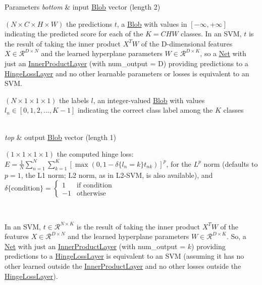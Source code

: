 \begin{DoxyParams}{Parameters}
{\em bottom} & input \mbox{\hyperlink{classcaffe_1_1_blob}{Blob}} vector (length 2)
\begin{DoxyEnumerate}
\item $ (N \times C \times H \times W) $ the predictions $ t $, a \mbox{\hyperlink{classcaffe_1_1_blob}{Blob}} with values in $ [-\infty, +\infty] $ indicating the predicted score for each of the $ K = CHW $ classes. In an S\+VM, $ t $ is the result of taking the inner product $ X^T W $ of the D-\/dimensional features $ X \in \mathcal{R}^{D \times N} $ and the learned hyperplane parameters $ W \in \mathcal{R}^{D \times K} $, so a \mbox{\hyperlink{classcaffe_1_1_net}{Net}} with just an \mbox{\hyperlink{classcaffe_1_1_inner_product_layer}{Inner\+Product\+Layer}} (with num\+\_\+output = D) providing predictions to a \mbox{\hyperlink{classcaffe_1_1_hinge_loss_layer}{Hinge\+Loss\+Layer}} and no other learnable parameters or losses is equivalent to an S\+VM.
\item $ (N \times 1 \times 1 \times 1) $ the labels $ l $, an integer-\/valued \mbox{\hyperlink{classcaffe_1_1_blob}{Blob}} with values $ l_n \in [0, 1, 2, ..., K - 1] $ indicating the correct class label among the $ K $ classes 
\end{DoxyEnumerate}\\
\hline
{\em top} & output \mbox{\hyperlink{classcaffe_1_1_blob}{Blob}} vector (length 1)
\begin{DoxyEnumerate}
\item $ (1 \times 1 \times 1 \times 1) $ the computed hinge loss\+: $ E = \frac{1}{N} \sum\limits_{n=1}^N \sum\limits_{k=1}^K [\max(0, 1 - \delta\{l_n = k\} t_{nk})] ^ p $, for the $ L^p $ norm (defaults to $ p = 1 $, the L1 norm; L2 norm, as in L2-\/\+S\+VM, is also available), and $ \delta\{\mathrm{condition}\} = \left\{ \begin{array}{lr} 1 & \mbox{if condition} \\ -1 & \mbox{otherwise} \end{array} \right. $
\end{DoxyEnumerate}\\
\hline
\end{DoxyParams}
In an S\+VM, $ t \in \mathcal{R}^{N \times K} $ is the result of taking the inner product $ X^T W $ of the features $ X \in \mathcal{R}^{D \times N} $ and the learned hyperplane parameters $ W \in \mathcal{R}^{D \times K} $. So, a \mbox{\hyperlink{classcaffe_1_1_net}{Net}} with just an \mbox{\hyperlink{classcaffe_1_1_inner_product_layer}{Inner\+Product\+Layer}} (with num\+\_\+output = $k$) providing predictions to a \mbox{\hyperlink{classcaffe_1_1_hinge_loss_layer}{Hinge\+Loss\+Layer}} is equivalent to an S\+VM (assuming it has no other learned outside the \mbox{\hyperlink{classcaffe_1_1_inner_product_layer}{Inner\+Product\+Layer}} and no other losses outside the \mbox{\hyperlink{classcaffe_1_1_hinge_loss_layer}{Hinge\+Loss\+Layer}}). 

